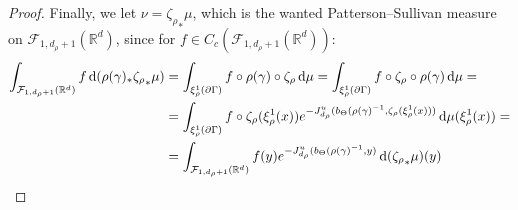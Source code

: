 \documentclass{report}
\begin{document}
\begin{proof}
    Finally, we let $\nu = {\zeta_\rho}_* \mu$, which is the wanted Patterson--Sullivan measure on $\mathcal F_{1, d_\rho + 1} (\mathbb R^d)$, since for $f \in C_c(\mathcal F_{1, d_\rho + 1} (\mathbb R^d))$:
    \begin{align*}
        \int_{\mathcal F_{1, d_\rho + 1} (\mathbb R^d)} f \,\mathrm{d}(\rho(\gamma)_* {\zeta_\rho}_* \mu) &=
        \int_{\xi_\rho^1(\partial \Gamma)} f \circ \rho(\gamma) \circ \zeta_\rho \,\mathrm{d} \mu =
        \int_{\xi_\rho^1(\partial \Gamma)} f \circ \zeta_\rho \circ \rho(\gamma) \,\mathrm{d} \mu =\\
        &=
        \int_{\xi_\rho^1(\partial \Gamma)} f \circ \zeta_\rho(\xi_\rho^1(x)) e^{-J_{d_\rho}^u(b_\Theta(\rho(\gamma)^{-1}, \zeta_\rho(\xi_\rho^1(x)))} \,\mathrm{d} \mu(\xi_\rho^1(x)) =\\
        &=
        \int_{\mathcal F_{1, d_\rho + 1} (\mathbb R^d)} 
        f(y) e^{-J_{d_\rho}^u(b_\Theta(\rho(\gamma)^{-1}, y)} \,\mathrm{d} ({\zeta_\rho}_*\mu)(y)
    \end{align*}
\end{proof}
\end{document}
